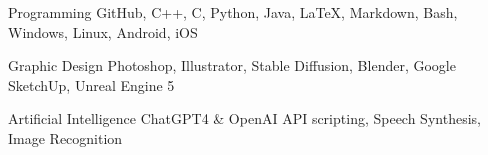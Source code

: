 


\begin{cvskills}


  \cvskill
    {Programming} %
    {GitHub, C++, C, Python, Java, LaTeX, Markdown, Bash, Windows, Linux, Android, iOS} %

  \cvskill
    {Graphic Design} %
    {Photoshop, Illustrator, Stable Diffusion, Blender, Google SketchUp, Unreal Engine 5} %

  \cvskill
    {Artificial Intelligence} %
	{ChatGPT4 \& OpenAI API scripting, Speech Synthesis, Image Recognition} %


\end{cvskills}
